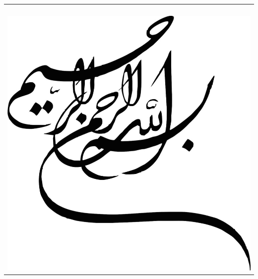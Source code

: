 \documentclass[twoside, a4paper,11pt]{book}
\numberwithin{equation}{chapter}
\numberwithin{table}{chapter}
\numberwithin{figure}{chapter}
\numberwithin{equation}{chapter}
\begin{document}
\newpage
\thispagestyle{empty}
\begin{center}
\begin{tabular}{c}
\\ \\ \\ \\ \\
\includegraphics[scale=0.7, origin=c]{Figures/besm1.jpg}\\
\end{tabular}
\end{center}
%


\newpage
\thispagestyle{empty}
\mbox{}
\end{document}
